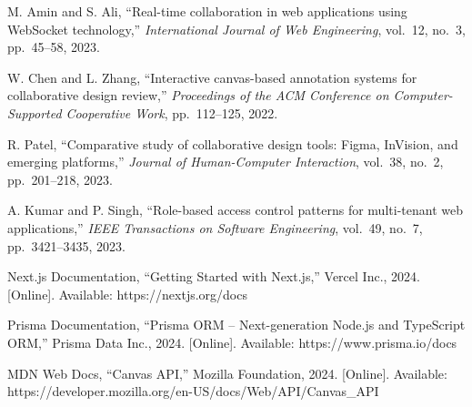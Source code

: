 \documentclass[12pt,a4paper]{article}
\begin{document}
\begin{enumerate}[label={[\arabic*]}]
    \item M. Amin and S. Ali, ``Real-time collaboration in web applications using WebSocket technology,'' \textit{International Journal of Web Engineering}, vol.~12, no.~3, pp.~45--58, 2023.

    \item W. Chen and L. Zhang, ``Interactive canvas-based annotation systems for collaborative design review,'' \textit{Proceedings of the ACM Conference on Computer-Supported Cooperative Work}, pp.~112--125, 2022.

    \item R. Patel, ``Comparative study of collaborative design tools: Figma, InVision, and emerging platforms,'' \textit{Journal of Human-Computer Interaction}, vol.~38, no.~2, pp.~201--218, 2023.

    \item A. Kumar and P. Singh, ``Role-based access control patterns for multi-tenant web applications,'' \textit{IEEE Transactions on Software Engineering}, vol.~49, no.~7, pp.~3421--3435, 2023.

    \item Next.js Documentation, ``Getting Started with Next.js,'' Vercel Inc., 2024. [Online]. Available: https://nextjs.org/docs

    \item Prisma Documentation, ``Prisma ORM -- Next-generation Node.js and TypeScript ORM,'' Prisma Data Inc., 2024. [Online]. Available: https://www.prisma.io/docs

    \item MDN Web Docs, ``Canvas API,'' Mozilla Foundation, 2024. [Online]. Available: https://developer.mozilla.org/en-US/docs/Web/API/Canvas\_API
\end{enumerate}
\end{document}
